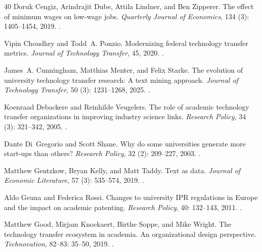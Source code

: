 \begin{thebibliography}{40}
Doruk Cengiz, Arindrajit Dube, Attila Lindner, and Ben Zipperer.
\newblock The effect of minimum wages on low-wage jobs.
\newblock \emph{Quarterly Journal of Economics}, 134 (3):
  1405--1454, 2019.
\newblock {}.

Vipin Choudhry and Todd~A. Ponzio.
\newblock Modernizing federal technology transfer metrics.
\newblock \emph{Journal of Technology Transfer}, 45, 2020.
\newblock {}.

James~A. Cunningham, Matthias Menter, and Felix Starke.
\newblock The evolution of university technology transfer research: A text
  mining approach.
\newblock \emph{Journal of Technology Transfer}, 50 (3):
  1231--1268, 2025.
\newblock {}.

Koenraad Debackere and Reinhilde Veugelers.
\newblock The role of academic technology transfer organizations in improving
  industry science links.
\newblock \emph{Research Policy}, 34 (3): 321--342, 2005.
\newblock {}.

Dante Di~Gregorio and Scott Shane.
\newblock Why do some universities generate more start-ups than others?
\newblock \emph{Research Policy}, 32 (2): 209--227, 2003.
\newblock {}.

Matthew Gentzkow, Bryan Kelly, and Matt Taddy.
\newblock Text as data.
\newblock \emph{Journal of Economic Literature}, 57 (3):
  535--574, 2019.
\newblock {}.

Aldo Geuna and Federica Rossi.
\newblock Changes to university {IPR} regulations in {Europe} and the impact on
  academic patenting.
\newblock \emph{Research Policy}, 40: 132--143, 2011.
\newblock {}.

Matthew Good, Mirjam Knockaert, Birthe Soppe, and Mike Wright.
\newblock The technology transfer ecosystem in academia. {An} organizational
  design perspective.
\newblock \emph{Technovation}, 82--83: 35--50, 2019.
\newblock {}.


\end{thebibliography}
